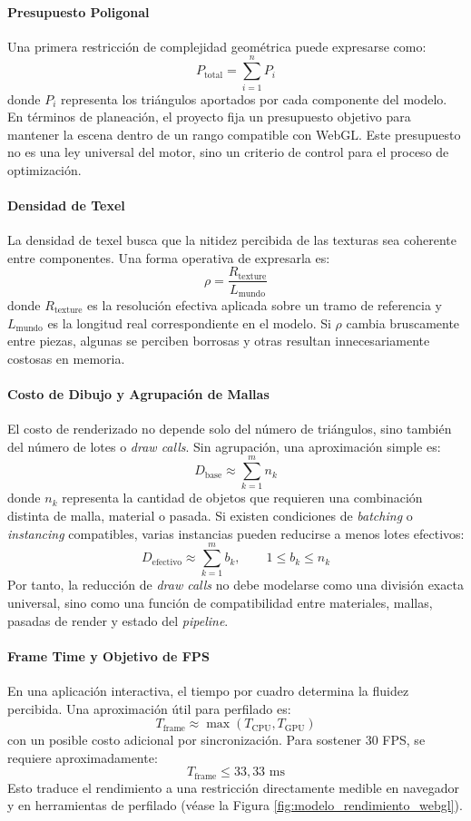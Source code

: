 \paragraph{Presupuesto Poligonal}
Una primera restricción de complejidad geométrica puede expresarse como:
\[
P_{\text{total}} = \sum_{i=1}^{n} P_i
\]
donde $P_i$ representa los triángulos aportados por cada componente del modelo. En términos de planeación, el proyecto fija un presupuesto objetivo para mantener la escena dentro de un rango compatible con WebGL. Este presupuesto no es una ley universal del motor, sino un criterio de control para el proceso de optimización.

\paragraph{Densidad de Texel}
La densidad de texel busca que la nitidez percibida de las texturas sea coherente entre componentes. Una forma operativa de expresarla es:
\[
\rho = \frac{R_{\text{texture}}}{L_{\text{mundo}}}
\]
donde $R_{\text{texture}}$ es la resolución efectiva aplicada sobre un tramo de referencia y $L_{\text{mundo}}$ es la longitud real correspondiente en el modelo. Si $\rho$ cambia bruscamente entre piezas, algunas se perciben borrosas y otras resultan innecesariamente costosas en memoria.

\paragraph{Costo de Dibujo y Agrupación de Mallas}
El costo de renderizado no depende solo del número de triángulos, sino también del número de lotes o \textit{draw calls}. Sin agrupación, una aproximación simple es:
\[
D_{\text{base}} \approx \sum_{k=1}^{m} n_k
\]
donde $n_k$ representa la cantidad de objetos que requieren una combinación distinta de malla, material o pasada. Si existen condiciones de \textit{batching} o \textit{instancing} compatibles, varias instancias pueden reducirse a menos lotes efectivos:
\[
D_{\text{efectivo}} \approx \sum_{k=1}^{m} b_k, \qquad 1 \leq b_k \leq n_k
\]
Por tanto, la reducción de \textit{draw calls} no debe modelarse como una división exacta universal, sino como una función de compatibilidad entre materiales, mallas, pasadas de render y estado del \textit{pipeline}.

\paragraph{Frame Time y Objetivo de FPS}
En una aplicación interactiva, el tiempo por cuadro determina la fluidez percibida. Una aproximación útil para perfilado es:
\[
T_{\text{frame}} \approx \max(T_{\text{CPU}}, T_{\text{GPU}})
\]
con un posible costo adicional por sincronización. Para sostener 30 FPS, se requiere aproximadamente:
\[
T_{\text{frame}} \leq 33{,}33 \text{ ms}
\]
Esto traduce el rendimiento a una restricción directamente medible en navegador y en herramientas de perfilado (véase la Figura \ref{fig:modelo_rendimiento_webgl}).

